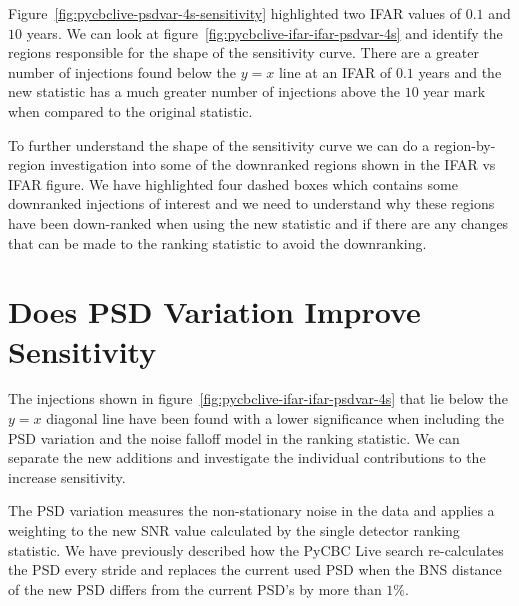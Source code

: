Figure~\ref{fig:pycbclive-psdvar-4s-sensitivity} highlighted two IFAR values of $0.1$ and $10$ years. We can look at figure~\ref{fig:pycbclive-ifar-ifar-psdvar-4s} and identify the regions responsible for the shape of the sensitivity curve. There are a greater number of injections found below the $y = x$ line at an IFAR of $0.1$ years and the new statistic has a much greater number of injections above the $10$ year mark when compared to the original statistic.

To further understand the shape of the sensitivity curve we can do a region-by-region investigation into some of the downranked regions shown in the IFAR vs IFAR figure. We have highlighted four dashed boxes which contains some downranked injections of interest and we need to understand why these regions have been down-ranked when using the new statistic and if there are any changes that can be made to the ranking statistic to avoid the downranking.

\section{\label{pycbclive-ignoring-psdvar}Does PSD Variation Improve Sensitivity}

The injections shown in figure~\ref{fig:pycbclive-ifar-ifar-psdvar-4s} that lie below the $y = x$ diagonal line have been found with a lower significance when including the PSD variation and the noise falloff model in the ranking statistic. We can separate the new additions and investigate the individual contributions to the increase sensitivity.

The PSD variation measures the non-stationary noise in the data and applies a weighting to the new SNR value calculated by the single detector ranking statistic. We have previously described how the PyCBC Live search re-calculates the PSD every stride and replaces the current used PSD when the BNS distance of the new PSD differs from the current PSD's by more than $1\%$.

